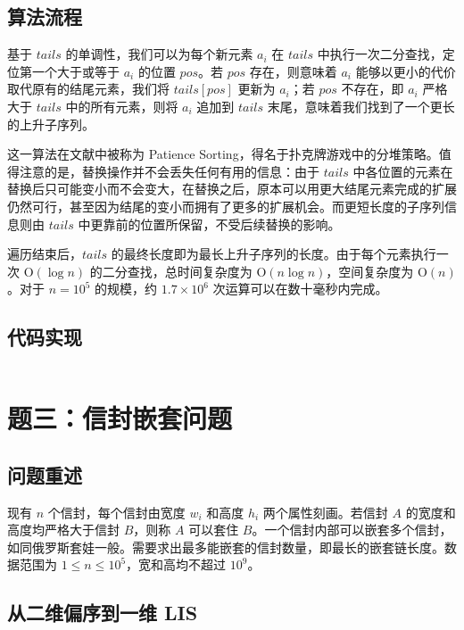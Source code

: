 \documentclass[12pt, a4paper]{academics}
\begin{document}
\subsection{算法流程}

基于 $\mathit{tails}$ 的单调性，我们可以为每个新元素 $a_i$ 在 $\mathit{tails}$ 中执行一次二分查找，定位第一个大于或等于 $a_i$ 的位置 $\mathit{pos}$。若 $\mathit{pos}$ 存在，则意味着 $a_i$ 能够以更小的代价取代原有的结尾元素，我们将 $\mathit{tails}[\mathit{pos}]$ 更新为 $a_i$；若 $\mathit{pos}$ 不存在，即 $a_i$ 严格大于 $\mathit{tails}$ 中的所有元素，则将 $a_i$ 追加到 $\mathit{tails}$ 末尾，意味着我们找到了一个更长的上升子序列。

这一算法在文献中被称为 Patience Sorting，得名于扑克牌游戏中的分堆策略。值得注意的是，替换操作并不会丢失任何有用的信息：由于 $\mathit{tails}$ 中各位置的元素在替换后只可能变小而不会变大，在替换之后，原本可以用更大结尾元素完成的扩展仍然可行，甚至因为结尾的变小而拥有了更多的扩展机会。而更短长度的子序列信息则由 $\mathit{tails}$ 中更靠前的位置所保留，不受后续替换的影响。

遍历结束后，$\mathit{tails}$ 的最终长度即为最长上升子序列的长度。由于每个元素执行一次 $\mathrm{O}(\log n)$ 的二分查找，总时间复杂度为 $\mathrm{O}(n \log n)$，空间复杂度为 $\mathrm{O}(n)$。对于 $n = 10^5$ 的规模，约 $1.7 \times 10^6$ 次运算可以在数十毫秒内完成。

\subsection{代码实现}

\inputminted{c++}{../src/p2_lis_fast.cpp}

\section{题三：信封嵌套问题}

\subsection{问题重述}

现有 $n$ 个信封，每个信封由宽度 $w_i$ 和高度 $h_i$ 两个属性刻画。若信封 $A$ 的宽度和高度均严格大于信封 $B$，则称 $A$ 可以套住 $B$。一个信封内部可以嵌套多个信封，如同俄罗斯套娃一般。需要求出最多能嵌套的信封数量，即最长的嵌套链长度。数据范围为 $1 \le n \le 10^5$，宽和高均不超过 $10^9$。

\subsection{从二维偏序到一维 LIS}
\end{document}
